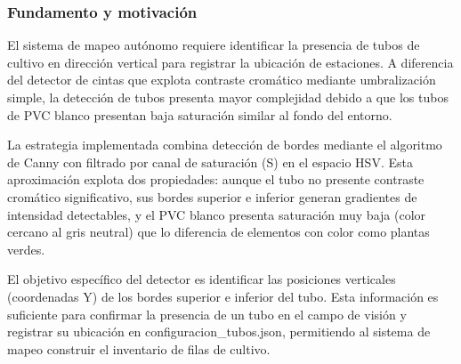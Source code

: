 \subsubsection{Fundamento y motivación}

El sistema de mapeo autónomo requiere identificar la presencia de tubos de cultivo en dirección vertical para registrar la ubicación de estaciones. A diferencia del detector de cintas que explota contraste cromático mediante umbralización simple, la detección de tubos presenta mayor complejidad debido a que los tubos de PVC blanco presentan baja saturación similar al fondo del entorno.

La estrategia implementada combina detección de bordes mediante el algoritmo de Canny con filtrado por canal de saturación (S) en el espacio HSV. Esta aproximación explota dos propiedades: aunque el tubo no presente contraste cromático significativo, sus bordes superior e inferior generan gradientes de intensidad detectables, y el PVC blanco presenta saturación muy baja (color cercano al gris neutral) que lo diferencia de elementos con color como plantas verdes.

El objetivo específico del detector es identificar las posiciones verticales (coordenadas Y) de los bordes superior e inferior del tubo. Esta información es suficiente para confirmar la presencia de un tubo en el campo de visión y registrar su ubicación en configuracion\_tubos.json, permitiendo al sistema de mapeo construir el inventario de filas de cultivo.

